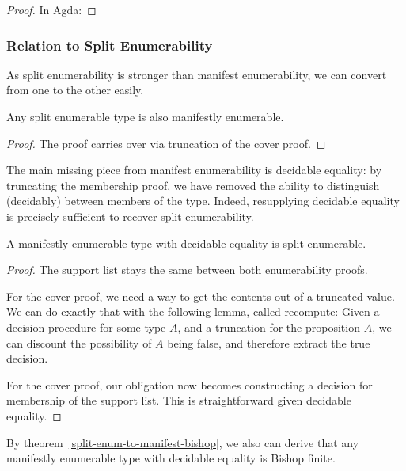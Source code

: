 \begin{refsection}
\begin{proof}
  In Agda:
\end{proof}
\subsubsection{Relation to Split Enumerability}
As split enumerability is stronger than manifest enumerability, we can convert
from one to the other easily.
\begin{lemma}
  Any split enumerable type is also manifestly enumerable.
\end{lemma}
\begin{proof}
  The proof carries over via truncation of the cover proof.
\end{proof}
The main missing piece from manifest enumerability is decidable equality: by
truncating the membership proof, we have removed the ability to distinguish
(decidably) between members of the type.
Indeed, resupplying decidable equality is precisely sufficient to recover split
enumerability.

\begin{theorem} \label{manifest-enum-to-split}
  A manifestly enumerable type with decidable equality is split enumerable.
\end{theorem}
\begin{proof}
  The support list stays the same between both enumerability proofs.

  For the cover proof, we need a way to get the contents out of a truncated
  value.
  We can do exactly that with the following lemma, called recompute:
  Given a decision procedure for some type \(A\), and a truncation for the
  proposition \(A\), we can discount the possibility of \(A\) being false, and
  therefore extract the true decision.

  For the cover proof, our obligation now becomes constructing a decision for
  membership of the support list.
  This is straightforward given decidable equality.

\end{proof}
By theorem~\ref{split-enum-to-manifest-bishop}, we also can derive that any
manifestly enumerable type with decidable equality is Bishop finite.

\end{refsection}
